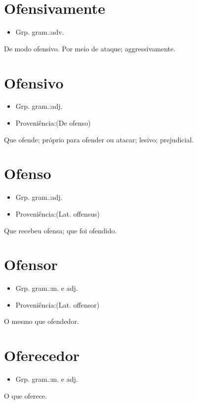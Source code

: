 \section{Ofensivamente}
\begin{itemize}
\item {Grp. gram.:adv.}
\end{itemize}
De modo ofensivo.
Por meio de ataque; aggressivamente.
\section{Ofensivo}
\begin{itemize}
\item {Grp. gram.:adj.}
\end{itemize}
\begin{itemize}
\item {Proveniência:(De \textunderscore ofenso\textunderscore )}
\end{itemize}
Que ofende; próprio para ofender ou atacar; lesivo; prejudicial.
\section{Ofenso}
\begin{itemize}
\item {Grp. gram.:adj.}
\end{itemize}
\begin{itemize}
\item {Proveniência:(Lat. \textunderscore offensus\textunderscore )}
\end{itemize}
Que recebeu ofensa; que foi ofendido.
\section{Ofensor}
\begin{itemize}
\item {Grp. gram.:m.  e  adj.}
\end{itemize}
\begin{itemize}
\item {Proveniência:(Lat. \textunderscore offensor\textunderscore )}
\end{itemize}
O mesmo que \textunderscore ofendedor\textunderscore .
\section{Oferecedor}
\begin{itemize}
\item {Grp. gram.:m.  e  adj.}
\end{itemize}
O que oferece.
